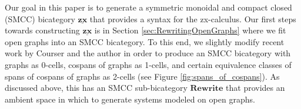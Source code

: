 Our goal in this paper is
to generate a
symmetric monoidal and compact closed (SMCC) 
bicategory $\underline{\mathbf{zx}}$
that provides a syntax for the zx-calculus. 
Our first steps towards constructing 
$\underline{\mathbf{zx}}$
is in Section 
	\ref{sec:RewritingOpenGraphs} 
where we fit open graphs 
into an SMCC bicategory.
To this end, 
we slightly modify recent
work by Courser and the author
	\cite{Cicala_SpansCospans,
		CicalaCourser_BicatSpansCospan}
in order to produce an SMCC bicategory 
with graphs as 0-cells, 
cospans of graphs as 1-cells, 
and certain equivalence classes 
of spans of cospans of graphs as 2-cells
(see Figure \ref{fig:spans_of_cospans}). 
As discussed above, this has an
SMCC sub-bicategory $\mathbf{Rewrite}$
that provides an ambient space 
in which to generate systems 
modeled on open graphs.  

